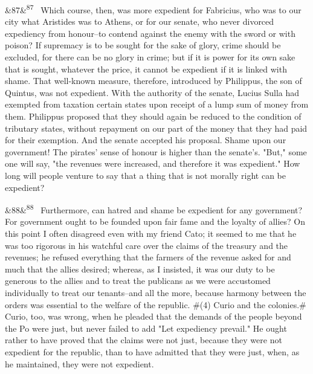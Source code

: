 \documentclass[12pt]{article}
\newcommand{\para}[1][]{\par\noindent\ifx&#1&\else\textsuperscript{\footnotesize #1}~\fi}
\begin{document}
\para[87] Which course, then, was more expedient for Fabricius, who was to our city what Aristides was to Athens, or for our senate, who never divorced expediency from honour--to contend against the enemy with the sword or with poison? If supremacy is to be sought for the sake of glory, crime should be excluded, for there can be no glory in crime; but if it is power for its own sake that is sought, whatever the price, it cannot be expedient if it is linked with shame. That well-known measure, therefore, introduced by Philippus, the son of Quintus, was not expedient. With the authority of the senate, Lucius Sulla had exempted from taxation certain states upon receipt of a lump sum of money from them. Philippus proposed that they should again be reduced to the condition of tributary states, without repayment on our part of the money that they had paid for their exemption. And the senate accepted his proposal. Shame upon our government! The pirates' sense of honour is higher than the senate's. "But," some one will say, "the revenues were increased, and therefore it was expedient." How long will people venture to say that a thing that is not morally right can be expedient?

\para[88] Furthermore, can hatred and shame be expedient for any government? For government ought to be founded upon fair fame and the loyalty of allies? On this point I often disagreed even with my friend Cato; it seemed to me that he was too rigorous in his watchful care over the claims of the treasury and the revenues; he refused everything that the farmers of the revenue asked for and much that the allies desired; whereas, as I insisted, it was our duty to be generous to the allies and to treat the publicans as we were accustomed individually to treat our tenants--and all the more, because harmony between the orders was essential to the welfare of the republic. \#(4) Curio and the colonies.\# Curio, too, was wrong, when he pleaded that the demands of the people beyond the Po were just, but never failed to add "Let expediency prevail." He ought rather to have proved that the claims were not just, because they were not expedient for the republic, than to have admitted that they were just, when, as he maintained, they were not expedient.
\end{document}
